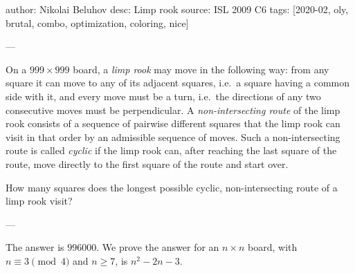 author: Nikolai Beluhov
desc: Limp rook
source: ISL 2009 C6
tags: [2020-02, oly, brutal, combo, optimization, coloring, nice]

---

On a $999\times999$ board, a \emph{limp rook} may move in the following way: from any square it can move to any of its adjacent squares, i.e.\ a square having a common side with it, and every move must be a turn, i.e.\ the directions of any two consecutive moves must be perpendicular. A \emph{non-intersecting route} of the limp rook consists of a sequence of pairwise different squares that the limp rook can visit in that order by an admissible sequence of moves. Such a non-intersecting route is called \emph{cyclic} if the limp rook can, after reaching the last square of the route, move directly to the first square of the route and start over.

How many squares does the longest possible cyclic, non-intersecting route of a limp rook visit?

---

The answer is $996000$. We prove the answer for an $n\times n$ board, with $n\equiv3\pmod4$ and $n\ge7$, is $n^2-2n-3$.

\bigskip

